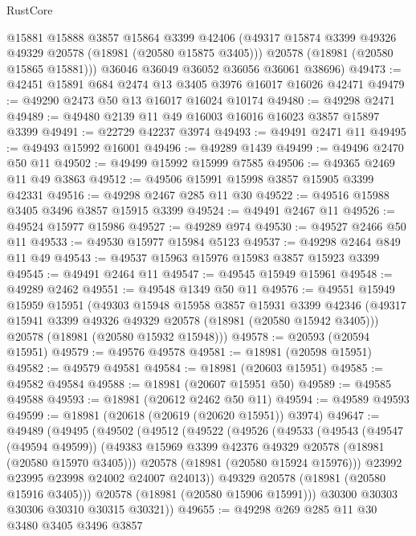 \begin{lexlean}{RustCore}
\begin{coremodule}
        @15881
        @15888
        @3857
        @15864
        @3399
        @42406
        (@49317 @15874 @3399 @49326 @49329 @20578 (@18981 (@20580 @15875 @3405)))
        @20578
        (@18981 (@20580 @15865 @15881)))
      @36046
      @36049
      @36052
      @36056
      @36061
      @38696)
@49473 := @42451 @15891 @684 @2474 @13 @3405 @3976 @16017 @16026 @42471
@49479 := @49290 @2473 @50 @13 @16017 @16024 @10174
@49480 := @49298 @2471
@49489 := @49480 @2139 @11 @49 @16003 @16016 @16023 @3857 @15897 @3399
@49491 := @22729 @42237 @3974
@49493 := @49491 @2471 @11
@49495 := @49493 @15992 @16001
@49496 := @49289 @1439
@49499 := @49496 @2470 @50 @11
@49502 := @49499 @15992 @15999 @7585
@49506 := @49365 @2469 @11 @49 @3863
@49512 := @49506 @15991 @15998 @3857 @15905 @3399 @42331
@49516 := @49298 @2467 @285 @11 @30
@49522 := @49516 @15988 @3405 @3496 @3857 @15915 @3399
@49524 := @49491 @2467 @11
@49526 := @49524 @15977 @15986
@49527 := @49289 @974
@49530 := @49527 @2466 @50 @11
@49533 := @49530 @15977 @15984 @5123
@49537 := @49298 @2464 @849 @11 @49
@49543 := @49537 @15963 @15976 @15983 @3857 @15923 @3399
@49545 := @49491 @2464 @11
@49547 := @49545 @15949 @15961
@49548 := @49289 @2462
@49551 := @49548 @1349 @50 @11
@49576 := @49551
    @15949
    @15959
    @15951
    (@49303
      @15948
      @15958
      @3857
      @15931
      @3399
      @42346
      (@49317 @15941 @3399 @49326 @49329 @20578 (@18981 (@20580 @15942 @3405)))
      @20578
      (@18981 (@20580 @15932 @15948)))
@49578 := @20593 (@20594 @15951)
@49579 := @49576 @49578
@49581 := @18981 (@20598 @15951)
@49582 := @49579 @49581
@49584 := @18981 (@20603 @15951)
@49585 := @49582 @49584
@49588 := @18981 (@20607 @15951 @50)
@49589 := @49585 @49588
@49593 := @18981 (@20612 @2462 @50 @11)
@49594 := @49589 @49593
@49599 := @18981 (@20618 (@20619 (@20620 @15951)) @3974)
@49647 := @49489
    (@49495
      (@49502
        (@49512
          (@49522
            (@49526
              (@49533
                (@49543
                  (@49547 (@49594 @49599))
                  (@49383 @15969 @3399 @42376 @49329 @20578 (@18981 (@20580 @15970 @3405)))
                  @20578
                  (@18981 (@20580 @15924 @15976)))
                @23992
                @23995
                @23998
                @24002
                @24007
                @24013))
            @49329
            @20578
            (@18981 (@20580 @15916 @3405)))
          @20578
          (@18981 (@20580 @15906 @15991)))
        @30300
        @30303
        @30306
        @30310
        @30315
        @30321))
@49655 := @49298 @269 @285 @11 @30 @3480 @3405 @3496 @3857

\end{coremodule}
\end{lexlean}
